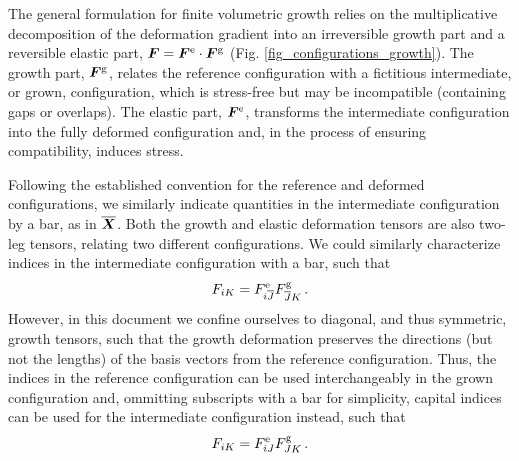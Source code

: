 \documentclass[10pt,letterpaper,oneside]{report}
\newcommand{\ten}[1]{\mbox{\boldmath $#1$}{}}
\newcommand{\scas}[1]{\mbox{{\scriptsize{${\rm{#1}}$}}}{}}
\begin{document}
\begin{itemize}
The general formulation for finite volumetric growth relies on the multiplicative decomposition of the deformation gradient \cite{Rodriguez1994} into an irreversible growth part and a reversible elastic part, $\ten{F} = \ten{F}^{\scas{e}} \cdot \ten{F}^{\scas{g}}$ (Fig. \ref{fig_configurations_growth}).  The growth part, $\ten{F}^{\scas{g}}$, relates the reference configuration with a fictitious intermediate, or grown, configuration, which is stress-free but may be incompatible (containing gaps or overlaps).  The elastic part, $\ten{F}^{\scas{e}}$, transforms the intermediate configuration into the fully deformed configuration and, in the process of ensuring compatibility, induces stress.  

Following the established convention for the reference and deformed configurations, we similarly indicate quantities in the intermediate configuration by a bar, as in $\overline{\ten{X}}$.  
Both the growth and elastic deformation tensors are also two-leg tensors, relating two different configurations.  We could similarly characterize indices in the intermediate configuration with a bar, such that 
\begin{equation}
F_{iK} = F^{\scas{e}}_{i\overline{J}} F^{\scas{g}}_{\overline{J} K} \, .
\end{equation}
However, in this document we confine ourselves to diagonal, and thus symmetric, growth tensors, such that the growth deformation preserves the directions (but not the lengths) of the basis vectors from the reference configuration.  Thus, the indices in the reference configuration can be used interchangeably in the grown configuration and, ommitting subscripts with a bar for simplicity, capital indices can be used for the intermediate configuration instead, such that
\begin{equation}
F_{iK} = F^{\scas{e}}_{iJ} F^{\scas{g}}_{JK} \, .  
\end{equation}


\end{itemize}
\end{document}
